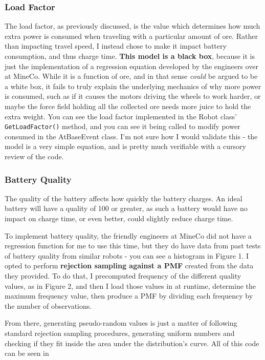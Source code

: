 \documentclass{article}
\begin{document}
\subsubsection{Load Factor}
The load factor, as previously discussed, is the value which determines how much extra power is consumed when traveling with a particular amount of ore.
Rather than impacting travel speed, I instead chose to make it impact battery consumption, and thus charge time.
\textbf{This model is a black box}, because it is just the implementation of a regression equation developed by the engineers over at MineCo.
While it is a function of ore, and in that sense \textit{could} be argued to be a white box, it fails to truly explain the underlying mechanics of why more power is consumed, such as if it causes the motors driving the wheels to work harder, or maybe the force field holding all the collected ore needs more juice to hold the extra weight.
You can see the load factor implemented in the Robot class' \texttt{GetLoadFactor()} method, and you can see it being called to modify power consumed in the AtBaseEvent class. I'm not sure how I would validate this - the model is a very simple equation, and is pretty much verifiable with a cursory review of the code.

\subsubsection{Battery Quality}
The quality of the battery affects how quickly the battery charges. 
An ideal battery will have a quality of 100 or greater, as such a battery would have no impact on charge time, or even better, could slightly reduce charge time.

To implement battery quality, the friendly engineers at MineCo did not have a regression function for me to use this time, but they do have data from past tests of battery quality from similar robots - you can see a histogram in Figure 1.
I opted to perform \textbf{rejection sampling against a PMF} created from the data they provided.
To do that, I precomputed frequency of the different quality values, as in Figure 2, and then I load those values in at runtime, determine the maximum frequency value, then produce a PMF by dividing each frequency by the number of observations.

From there, generating pseudo-random values is just a matter of following standard rejection sampling procedures, generating uniform numbers and checking if they fit inside the area under the distribution's curve. All of this code can be seen in 
\end{document}
